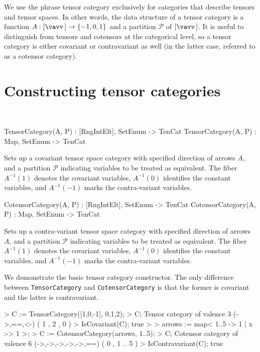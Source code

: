 We use the phrase tensor category exclusively for categories that describe tensors and tensor spaces.
In other words, the data structure of a tensor category is a function 
$A:[\vav]\rightarrow \{-1,0,1\}$ and a partition $\mathcal{P}$ of $[\vav]$.
It is useful to distinguish from tensors and cotensors at the categorical level,
so a tensor category is either covariant or contravariant as well 
(in the latter case, referred to as a cotensor category).

\section{Constructing tensor categories}~

\begin{intrinsics}
TensorCategory(A, P) : [RngIntElt], {SetEnum} -> TenCat
TensorCategory(A, P) : Map, {SetEnum} -> TenCat
\end{intrinsics}

Sets up a covariant tensor space category with specified direction of
arrows $A$, and a partition $\mathcal{P}$ indicating variables to be treated as
equivalent.  The fiber $A^{-1}(1)$ denotes the covariant variables,
$A^{-1}(0)$ identifies the constant variables, and $A^{-1}(-1)$ marks
the contra-variant variables.  

\begin{intrinsics}
CotensorCategory(A, P) : [RngIntElt], {SetEnum} -> TenCat
CotensorCategory(A, P) : Map, {SetEnum} -> TenCat
\end{intrinsics}

Sets up a contra-variant tensor space category with specified direction of
arrows $A$, and a partition $\mathcal{P}$ indicating variables to be treated as
equivalent.  The fiber $A^{-1}(1)$ denotes the covariant variables,
$A^{-1}(0)$ identifies the constant variables, and $A^{-1}(-1)$ marks
the contra-variant variables.  

\begin{example}[BasicCatConst]

We demonstrate the basic tensor category constructor. 
The only difference between \texttt{TensorCategory} and \texttt{CotensorCategory} is that the former is covariant and the latter is contravariant.
\begin{code}
> C := TensorCategory([1,0,-1], {{0},{1},{2}});
> C;
Tensor category of valence 3 (->,==,<-) ({ 1 },{ 2 },{ 0 })
> IsCovariant(C);
true
> 
> arrows := map< {1..5} -> {1} | x :-> 1 >;
> C := CotensorCategory(arrows, {{1..5}});
> C;
Cotensor category of valence 6 (->,->,->,->,->,==) ({ 0 },{ 1 .. 5 })
> IsContravariant(C);
true
\end{code}
\end{example}


